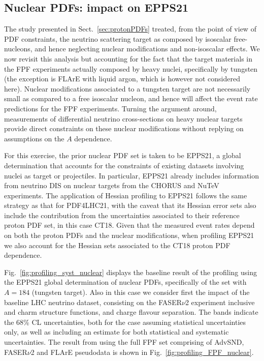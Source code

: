 \clearpage

\subsection{Nuclear PDFs: impact on EPPS21}
\label{sec:nuclearPDFs}

The study presented in Sect.~\ref{sec:protonPDFs} treated, from the point of view
of PDF constraints, the neutrino scattering target
as composed by isoscalar free-nucleons, and hence neglecting nuclear modifications
and non-isoscalar effects.
%
We now revisit this analysis but accounting for the fact that the target materials in the FPF
experiments actually
composed by heavy nuclei, specifically by tungsten (the exception is FLArE with liquid argon, which
is however not considered here).
%
Nuclear modifications associated to a tungsten target are not necessarily small as compared
to a free isoscalar nucleon, and hence will affect the event rate predictions for
the FPF experiments.
%
Turning the argument around, measurements of differential neutrino cross-sections
on heavy nuclear targets provide direct constraints on these nuclear modifications
without replying on assumptions on the $A$ dependence.

For this exercise, the prior nuclear PDF set is taken to be EPPS21, a global determination
that accounts for the constraints of existing datasets involving nuclei as target or projectiles.
%
In particular, EPPS21 already includes information from neutrino DIS on nuclear targets
from the CHORUS and NuTeV experiments.
%
The application of Hessian profiling to EPPS21 follows the same strategy as that
for PDF4LHC21, with the caveat that its Hessian error sets also include the contribution
from the uncertainties  associated to their reference proton PDF set, in this case CT18.
%
Given that the measured event rates depend on both the proton PDFs and the nuclear modifications,
when profiling EPPS21 we also account for the Hessian sets associated to the CT18 proton
PDF dependence.

Fig.~\ref{fig:profiling_syst_nuclear} displays the baseline result of the profiling using the EPPS21 global determination of nuclear PDFs,
specifically of the set with $A=184$ (tungsten target).
%
Also in this case we consider first the impact of the baseline LHC neutrino dataset, consisting
on the FASER$\nu$2 experiment inclusive and charm structure functions,  and charge flavour
separation. 
The bands indicate the 68\% CL uncertainties, 
both for the case assuming statistical uncertainties only, 
as well as including an estimate for both statistical and systematic uncertainties.
The result from using the full FPF set comprising of AdvSND, FASER$\nu$2 and FLArE pseudodata is shown in Fig.~\ref{fig:profiling_FPF_nuclear}.

